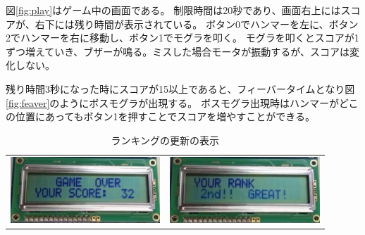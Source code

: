 \documentclass[11pt,a4j]{jsarticle}
\makeatletter
\newcommand{\figcaption}[1]{\def\@captype{figure}\caption{#1}}
\makeatother
\begin{document}
図\ref{fig:play}はゲーム中の画面である。
制限時間は20秒であり、画面右上にはスコアが、右下には残り時間が表示されている。
ボタン0でハンマーを左に、ボタン2でハンマーを右に移動し、ボタン1でモグラを叩く。
モグラを叩くとスコアが1ずつ増えていき、ブザーが鳴る。ミスした場合モータが振動するが、スコアは変化しない。


残り時間3秒になった時にスコアが15以上であると、フィーバータイムとなり図\ref{fig:feaver}のようにボスモグラが出現する。
ボスモグラ出現時はハンマーがどこの位置にあってもボタン1を押すことでスコアを増やすことができる。


\begin{table}[H]
	\begin{center}
	\begin{tabular}{cc}
	\begin{minipage}{0.49\hsize}
    \centering
    \includegraphics[height=25mm,bb=0 0 766 342]{img/result.png}
    \figcaption{結果の表示}
    \label{fig:result}
	\end{minipage} &
	\begin{minipage}{0.49\hsize}
    \centering
    \includegraphics[height=25mm,bb=0 0 755 335]{img/update.png}
    \figcaption{ランキングの更新の表示}
    \label{fig:update}
	\end{minipage} \\
	\end{tabular}
	\end{center}
\end{table}

%
\end{document}
